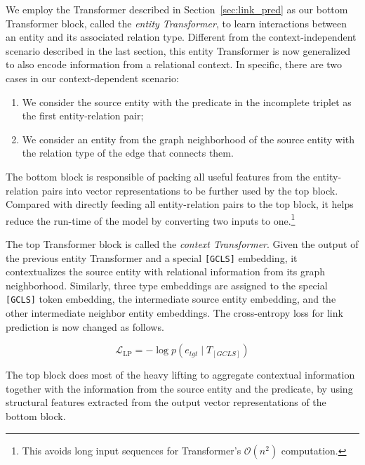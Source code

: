 \documentclass[11pt]{article}
\begin{document}
We employ the Transformer described in Section~\ref{sec:link_pred} as our bottom Transformer block, called the \emph{entity Transformer}, to learn interactions between an entity and its associated relation type.
Different from the context-independent scenario described in the last section, this entity Transformer is now generalized to also encode information from a relational context.
In specific, there are two cases in our context-dependent scenario:
\begin{enumerate} 
\item We consider the source entity with the predicate in the incomplete triplet as the first entity-relation pair; 
\item We consider an entity from the graph neighborhood of the source entity with the relation type of the edge that connects them.
\end{enumerate}
The bottom block is responsible of packing all useful features from the entity-relation pairs into vector representations to be further used by the top block. Compared with directly feeding all entity-relation pairs to the top block, it helps reduce the run-time of the model by converting two inputs to one.\footnote{This avoids long input sequences for Transformer's $\mathcal{O}(n^2)$ computation.}

The top Transformer block is called the \emph{context Transformer}.
Given the output of the previous entity Transformer and a special \texttt{[GCLS]} embedding, it contextualizes the source entity with relational information from its graph neighborhood.
Similarly, three type embeddings are assigned to the special \texttt{[GCLS]} token embedding, the intermediate source entity embedding, and the other intermediate neighbor entity embeddings.
The cross-entropy loss for link prediction is now changed as follows.

\begin{equation}
\mathcal{L}_{\text{LP}}=-\log p(e_{\mathit{tgt}} \mid T_{[\mathit{GCLS}]})
\end{equation}

The top block does most of the heavy lifting to aggregate contextual information together with the information from the source entity and the predicate, by using structural features extracted from the output vector representations of the bottom block.
\end{document}
